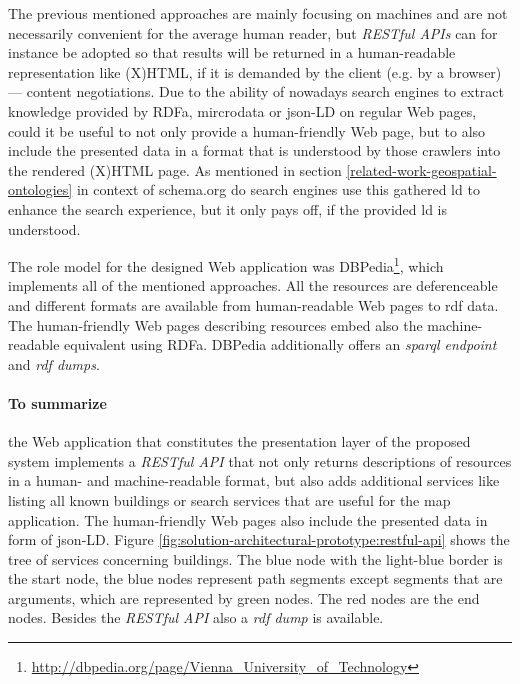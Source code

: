 \documentclass[draft,final]{vutinfth} %
\begin{document}
The previous mentioned approaches are mainly focusing on machines and are not necessarily convenient for the average human reader, but \textit{RESTful APIs} can for instance be adopted so that results will be returned in a human-readable representation like (X)HTML, if it is demanded by the client (e.g. by a browser) --- content negotiations. Due to the ability of nowadays search engines to extract knowledge provided by RDFa, mircrodata or \gls{json}-LD on regular Web pages, could it be useful to not only provide a human-friendly Web page, but to also include the presented data in a format that is understood by those crawlers into the rendered (X)HTML page. As mentioned in section \ref{related-work-geospatial-ontologies} in context of schema.org do search engines use this gathered \gls{ld} to enhance the search experience, but it only pays off, if the provided \gls{ld} is understood.

The role model for the designed Web application was DBPedia\footnote{\url{http://dbpedia.org/page/Vienna_University_of_Technology}}, which implements all of the mentioned approaches. All the resources are deferenceable and different formats are available from human-readable Web pages to \gls{rdf} data. The human-friendly Web pages describing resources embed also the machine-readable equivalent using RDFa. DBPedia additionally offers an \textit{\gls{sparql} endpoint} and \textit{\gls{rdf} dumps}.

\paragraph{To summarize} the Web application that constitutes the presentation layer of the proposed system implements a \textit{RESTful API} that not only returns descriptions of resources in a human- and machine-readable format, but also adds additional services like listing all known buildings or search services that are useful for the map application. The human-friendly Web pages also include the presented data in form of \gls{json}-LD. Figure \ref{fig:solution-architectural-prototype:restful-api} shows the tree of services concerning buildings. The blue node with the light-blue border is the start node, the blue nodes represent path segments except segments that are arguments, which are represented by green nodes. The red nodes are the end nodes.  Besides the \textit{RESTful API} also a \textit{\gls{rdf} dump} is available.
\end{document}
